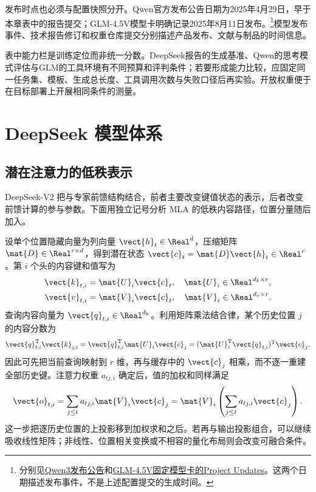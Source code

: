 \documentclass[../textbook.tex]{subfiles}
\begin{document}
发布时点也必须与配置快照分开。Qwen官方发布公告日期为2025年4月29日，早于本章表中的报告提交；GLM-4.5V模型卡明确记录2025年8月11日发布。\footnote{分别见\href{https://qwenlm.github.io/blog/qwen3/}{Qwen3发布公告}和\href{https://huggingface.co/zai-org/GLM-4.5V/blob/ed47433b37111465ec527affaaddceff371bca04/README.md}{GLM-4.5V固定模型卡的Project Updates}。这两个日期描述发布事件，不是上述配置提交的生成时间。}模型发布事件、技术报告修订和权重仓库提交分别描述产品发布、文献与制品的时间信息。

表中能力栏是训练定位而非统一分数。DeepSeek报告的生成基准、Qwen的思考模式评估与GLM的工具环境有不同预算和评判条件；若要形成能力比较，应固定同一任务集、模板、生成总长度、工具调用次数与失败口径后再实验。开放权重便于在目标部署上开展相同条件的测量。

\section{DeepSeek 模型体系}

\subsection{潜在注意力的低秩表示}
DeepSeek-V2 把与专家前馈结构结合，前者主要改变键值状态的表示，后者改变前馈计算的参与参数\cite{deepseek2024v2}。下面用独立记号分析 MLA 的低秩内容路径，位置分量随后加入。

设单个位置隐藏向量为列向量 $\vect{h}_t\in\Real^d$，压缩矩阵 $\mat{D}\in\Real^{r\times d}$，得到潜在状态 $\vect{c}_t=\mat{D}\vect{h}_t\in\Real^r$。第 $i$ 个头的内容键和值写为
\begin{equation}\label{eq:open-latent}
 \begin{aligned}
  \vect{k}_{t,i}&=\mat{U}_i \vect{c}_t,\quad \mat{U}_i\in\Real^{d_k\times r},\\
  \vect{v}_{t,i}&=\mat{V}_i \vect{c}_t,\quad \mat{V}_i\in\Real^{d_v\times r}.
 \end{aligned}
\end{equation}
查询内容向量为 $\vect{q}_{t,i}\in\Real^{d_k}$。利用矩阵乘法结合律，某个历史位置 $j$ 的内容分数为
\begin{equation}
 \vect{q}_{t,i}^{\mathrm{T}}\vect{k}_{j,i}
 =\vect{q}_{t,i}^{\mathrm{T}}\mat{U}_i \vect{c}_j
 =(\mat{U}_i^{\mathrm{T}}\vect{q}_{t,i})^{\mathrm{T}}\vect{c}_j.
\end{equation}
因此可先把当前查询映射到 $r$ 维，再与缓存中的 $\vect{c}_j$ 相乘，而不逐一重建全部历史键。注意力权重 $a_{tj,i}$ 确定后，值的加权和同样满足
\begin{equation}
 \vect{o}_{t,i}=\sum_{j\le t}a_{tj,i}\mat{V}_i \vect{c}_j
 =\mat{V}_i\left(\sum_{j\le t}a_{tj,i}\vect{c}_j\right).
\end{equation}
这一步把逐历史位置的上投影移到加权求和之后。若再与输出投影组合，可以继续吸收线性矩阵；非线性、位置相关变换或不相容的量化布局则会改变可融合条件。
\end{document}
